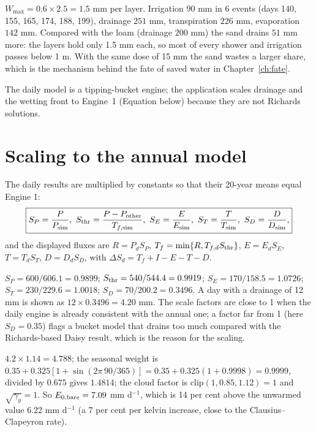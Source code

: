 \sol  $W_{\max}=0.6\times2.5=1.5$ mm per layer. Irrigation $90$ mm in 6 events (days 140, 155, 165, 174, 188, 199), drainage $251$ mm, transpiration $226$ mm, evaporation $142$ mm. Compared with the loam (drainage $200$ mm) the sand drains $51$ mm more: the layers hold only 1.5 mm each, so most of every shower and irrigation passes below 1 m. With the same dose of 15 mm the sand wastes a larger share, which is the mechanism behind the fate of saved water in Chapter~\ref{ch:fate}.

 The daily model is a tipping-bucket engine; the application scales drainage and the wetting front to Engine~1 (Equation below) because they are not Richards solutions.


\section{Scaling to the annual model}
The daily results are multiplied by constants so that their 20-year means equal Engine 1:
\begin{equation}\boxed{S_P=\frac P{P_{\rm sim}},\ S_{\rm thr}=\frac{P-P_{\rm other}}{T_{f,\rm sim}},\ S_E=\frac E{E_{\rm sim}},\ S_T=\frac T{T_{\rm sim}},\ S_D=\frac D{D_{\rm sim}},}\end{equation}
and the displayed fluxes are $R=P_dS_P$, $T_f=\min\{R,T_{f,d}S_{\rm thr}\}$, $E=E_dS_E$, $T=T_dS_T$, $D=D_dS_D$, with $\Delta S_d=T_f+I-E-T-D$.

\sol  $S_P=600/606.1=0.9899$; $S_{\rm thr}=540/544.4=0.9919$; $S_E=170/158.5=1.0726$; $S_T=230/229.6=1.0018$; $S_D=70/200.2=0.3496$. A day with a drainage of 12 mm is shown as $12\times0.3496=4.20$ mm. The scale factors are close to 1 when the daily engine is already consistent with the annual one; a factor far from 1 (here $S_D=0.35$) flags a bucket model that drains too much compared with the Richards-based Daisy result, which is the reason for the scaling.


\sol  $4.2\times1.14=4.788$; the seasonal weight is $0.35+0.325[1+\sin(2\pi\,90/365)]=0.35+0.325(1+0.9998)=0.9999$, divided by $0.675$ gives $1.4814$; the cloud factor is $\mathrm{clip}(1,0.85,1.12)=1$ and $\sqrt{\gamma_y}=1$. So $E_{0,\rm bare}=7.09$ mm d$^{-1}$, which is 14 per cent above the unwarmed value 6.22 mm d$^{-1}$ (a 7 per cent per kelvin increase, close to the Clausius--Clapeyron rate).

